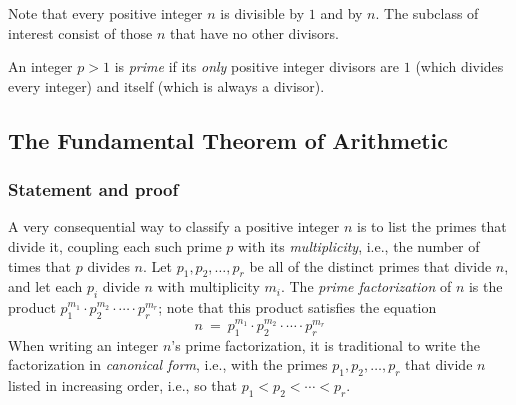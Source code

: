 Note that every positive integer $n$ is divisible by $1$ and by $n$.
The subclass of interest consist of those $n$ that have no other
divisors.

An integer $p >1$ is {\it prime}
if its {\em only} positive integer divisors are $1$ (which divides
every integer) and itself (which is always a divisor).
\bigskip

\noindent {}
\bigskip
  
\subsection{The Fundamental Theorem of Arithmetic}
\label{sec:Fund-Thm-Arith}

\subsubsection{Statement and proof}
\label{sec:FTA-basics}

A very consequential way to classify a positive integer $n$ is to list
the primes that divide it, coupling each such prime $p$ with its {\it
  multiplicity}, i.e., the number of times that $p$ divides $n$.  Let
$p_1, p_2, \ldots, p_r$ be all of the distinct primes that divide $n$,
and let each $p_i$ divide $n$ with multiplicity $m_i$.  The {\it prime
  factorization}   
of $n$ is the product $p_1^{m_1} \cdot p_2^{m_2} \cdot \cdots \cdot
p_r^{m_r}$; note that this product satisfies the equation
\begin{equation}
\label{eq:prime-factorization}
n \ = \ p_1^{m_1} \cdot p_2^{m_2} \cdot \cdots \cdot p_r^{m_r}
\end{equation}
When writing an integer $n$'s prime factorization, it is traditional
to write the factorization in {\it canonical form},
i.e., with the primes $p_1, p_2, \ldots, p_r$ that divide $n$ listed
in increasing order, i.e., so that $p_1 < p_2 < \cdots < p_r$.

